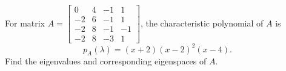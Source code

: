For matrix $A = \begin{bmatrix} 0 & 4 & -1 & 1\\-2 & 6 & -1 & 1\\-2 & 8 & -1 & -1\\-2 & 8 & -3 & 1 \end{bmatrix}$, the characteristic polynomial of $A$ is \[p_A(\lambda) = (x+2)(x-2)^2(x-4).\]  Find the eigenvalues and  corresponding eigenspaces of $A$.